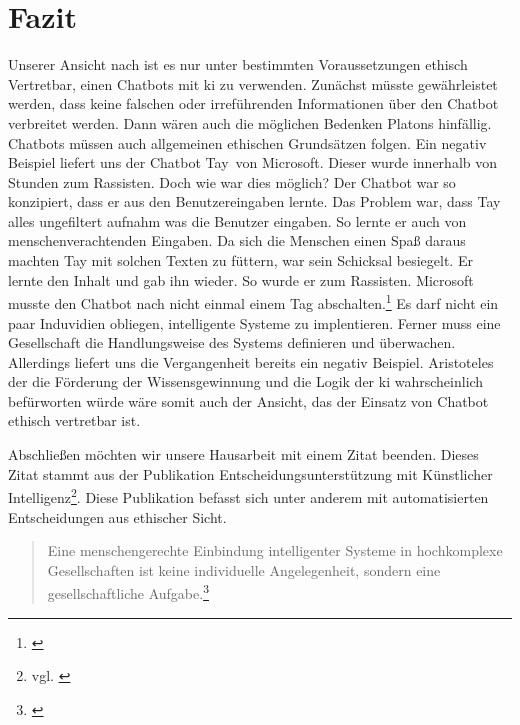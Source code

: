 \section{Fazit}
Unserer Ansicht nach ist es nur unter bestimmten Voraussetzungen ethisch Vertretbar, einen Chatbots mit \ac{ki} zu verwenden.\newline
Zunächst müsste gewährleistet werden, dass keine falschen oder irreführenden Informationen über den Chatbot verbreitet werden. Dann wären auch die möglichen Bedenken Platons hinfällig. \newline
Chatbots müssen auch allgemeinen ethischen Grundsätzen folgen. Ein negativ Beispiel liefert uns der Chatbot \glqq Tay\grqq\ von Microsoft. Dieser wurde innerhalb von Stunden zum Rassisten. Doch wie war dies möglich? Der Chatbot war so konzipiert, dass er aus den Benutzereingaben lernte. Das Problem war, dass Tay alles ungefiltert aufnahm was die Benutzer eingaben. So lernte er auch von menschenverachtenden Eingaben. Da sich die Menschen einen Spaß daraus machten Tay mit solchen Texten zu \glqq füttern\grqq, war sein Schicksal besiegelt. Er lernte den Inhalt und gab ihn wieder. So wurde er zum Rassisten. Microsoft musste den Chatbot nach nicht einmal einem Tag abschalten.\footnote{\cite{TaySpiegel}} \newline
Es darf nicht ein paar Induvidien obliegen, intelligente Systeme zu implentieren. Ferner muss eine Gesellschaft die Handlungsweise des Systems definieren und überwachen. Allerdings liefert uns die Vergangenheit bereits ein negativ Beispiel. \newline
Aristoteles der die Förderung der Wissensgewinnung und die Logik der \ac{ki} wahrscheinlich befürworten würde wäre somit auch der Ansicht, das der Einsatz von Chatbot ethisch vertretbar ist.

Abschließen möchten wir unsere Hausarbeit mit einem Zitat beenden. Dieses Zitat stammt aus der Publikation \glqq Entscheidungsunterstützung mit Künstlicher Intelligenz\grqq\footnote{vgl. \cite{Bitkom}}. Diese Publikation befasst sich unter anderem mit automatisierten Entscheidungen aus ethischer Sicht.
\begin{quote}
	 \glqq Eine menschengerechte Einbindung intelligenter Systeme in hochkomplexe Gesellschaften ist keine individuelle Angelegenheit, sondern eine gesellschaftliche Aufgabe.\grqq\footnote{\cite{BitkomZitat}}
\end{quote}

